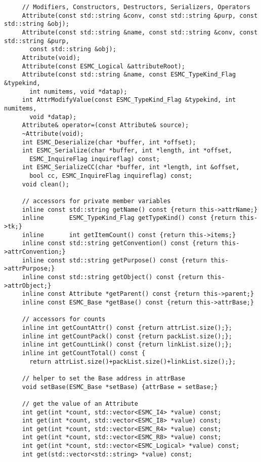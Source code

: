 \begin{verbatim}
     // Modifiers, Constructors, Destructors, Serializers, Operators
     Attribute(const std::string &conv, const std::string &purp, const std::string &obj);
     Attribute(const std::string &name, const std::string &conv, const std::string &purp,
       const std::string &obj);
     Attribute(void);
     Attribute(const ESMC_Logical &attributeRoot);
     Attribute(const std::string &name, const ESMC_TypeKind_Flag &typekind,
       int numitems, void *datap);
     int AttrModifyValue(const ESMC_TypeKind_Flag &typekind, int numitems,
       void *datap);
     Attribute& operator=(const Attribute& source);
     ~Attribute(void);
     int ESMC_Deserialize(char *buffer, int *offset);
     int ESMC_Serialize(char *buffer, int *length, int *offset,
       ESMC_InquireFlag inquireflag) const;
     int ESMC_SerializeCC(char *buffer, int *length, int &offset,
       bool cc, ESMC_InquireFlag inquireflag) const;
     void clean();
 
     // accessors for private member variables
     inline const std::string getName() const {return this->attrName;}
     inline       ESMC_TypeKind_Flag getTypeKind() const {return this->tk;}
     inline       int getItemCount() const {return this->items;}
     inline const std::string getConvention() const {return this->attrConvention;}
     inline const std::string getPurpose() const {return this->attrPurpose;}
     inline const std::string getObject() const {return this->attrObject;}
     inline const Attribute *getParent() const {return this->parent;}
     inline const ESMC_Base *getBase() const {return this->attrBase;}
 
     // accessors for counts
     inline int getCountAttr() const {return attrList.size();};
     inline int getCountPack() const {return packList.size();};
     inline int getCountLink() const {return linkList.size();};
     inline int getCountTotal() const {
       return attrList.size()+packList.size()+linkList.size();};
 
     // helper to set the Base address in attrBase
     void setBase(ESMC_Base *setBase) {attrBase = setBase;}
 
     // get the value of an Attribute
     int get(int *count, std::vector<ESMC_I4> *value) const;
     int get(int *count, std::vector<ESMC_I8> *value) const;
     int get(int *count, std::vector<ESMC_R4> *value) const;
     int get(int *count, std::vector<ESMC_R8> *value) const;
     int get(int *count, std::vector<ESMC_Logical> *value) const;
     int get(std::vector<std::string> *value) const;
 

\end{verbatim}
